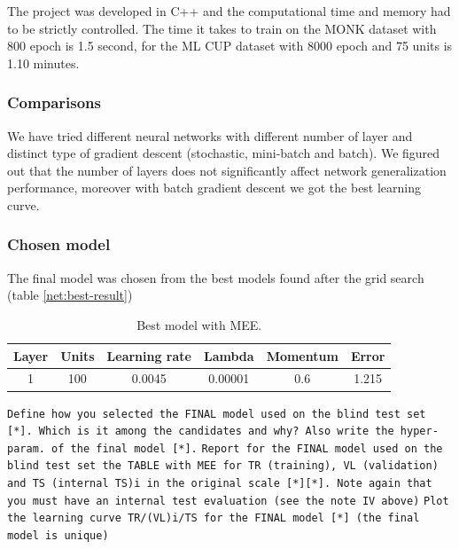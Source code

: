 The project was developed in C++ and the computational time and memory had to be strictly controlled.
The time it takes to train on the MONK dataset with 800 epoch is 1.5 second, for the ML CUP dataset with 8000 epoch and 75 units is 1.10 minutes.
\subsubsection{Comparisons}
We have tried different neural networks with different number of layer and distinct type of gradient descent (stochastic, mini-batch and batch). We figured out that the number of layers does not significantly affect network generalization performance, moreover with batch gradient descent we got the best learning curve.
\subsubsection{Chosen model}
The final model was chosen from the best models found after the grid search (table \ref{net:best-result})
\begin{table}[h!]
	\centering
	\begin{tabular}{|c|c|c|c|c|c|}
		\hline
		\textbf{Layer}& \textbf{Units}& \textbf{Learning rate} & \multicolumn{1}{l|}{\textbf{Lambda}} & \textbf{Momentum} & \textbf{Error}\\ \hline
			1 & 100 & 0.0045 & 0.00001 & 0.6  & 1.215 \\
		  \hline
	\end{tabular}
		\caption{Best model with MEE.}
\end{table}

\texttt{Define how you selected the FINAL model used on the blind test set [*]. Which is it among the candidates and why? Also write the  hyper-param. of the final model [*].}
\texttt{Report for the FINAL model used on the blind test set the TABLE with MEE for TR (training), VL (validation) and TS (internal TS)i  in the original scale [*][*]. Note again  that you must have an internal  test evaluation (see the note IV above)}
\texttt{Plot the learning curve TR/(VL)i/TS for the FINAL model [*] (the final model is unique) }

